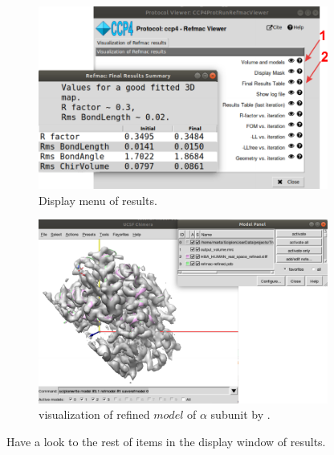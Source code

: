  \begin{figure}[H]
  \centering 
  \captionsetup{width=.7\linewidth} 
  \includegraphics[width=0.85\textwidth]{Images/Fig32}
  \caption{Display menu of  results.}
  \label{fig:refmac_display_results}
  \end{figure}
  
  \begin{figure}[H]
  \centering 
  \captionsetup{width=.7\linewidth} 
  \includegraphics[width=0.85\textwidth]{Images/Fig33}
  \caption{\chimera visualization of refined $model$ of  $\alpha$ subunit by .}
  \label{fig:refmac_chimera}
  \end{figure}
  
  Have a look to the rest of items in the display window of results. 
  

